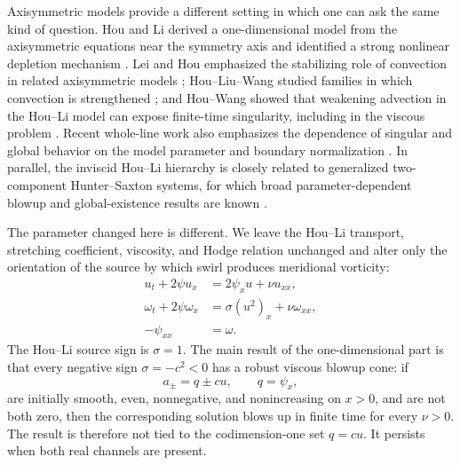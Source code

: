 \documentclass[11pt]{article}
\theoremstyle{definition}
\begin{document}
Axisymmetric models provide a different setting in which one can ask the same kind of question.  Hou and Li derived a one-dimensional model from the axisymmetric equations near the symmetry axis and identified a strong nonlinear depletion mechanism \cite{HouLi2008}.  Lei and Hou emphasized the stabilizing role of convection in related axisymmetric models \cite{LeiHou2009}; Hou--Liu--Wang studied families in which convection is strengthened \cite{HouLiuWang2018}; and Hou--Wang showed that weakening advection in the Hou--Li model can expose finite-time singularity, including in the viscous problem \cite{HouWang2024}.  Recent whole-line work also emphasizes the dependence of singular and global behavior on the model parameter and boundary normalization \cite{WangLi2026}.  In parallel, the inviscid Hou--Li hierarchy is closely related to generalized two-component Hunter--Saxton systems, for which broad parameter-dependent blowup and global-existence results are known \cite{Wunsch2010,WuWunsch2012,MoonLiu2012,Sarria2015}.

The parameter changed here is different.  We leave the Hou--Li transport, stretching coefficient, viscosity, and Hodge relation unchanged and alter only the orientation of the source by which swirl produces meridional vorticity:
\begin{equation}\label{eq:intro-model}
\begin{aligned}
 u_t+2\psi u_x&=2\psi_xu+\nu u_{xx},\\
 \omega_t+2\psi\omega_x&=\sigma (u^2)_x+\nu\omega_{xx},\\
 -\psi_{xx}&=\omega.
\end{aligned}
\end{equation}
The Hou--Li source sign is $\sigma=1$.  The main result of the one-dimensional part is that every negative sign $\sigma=-c^2<0$ has a robust viscous blowup cone: if
\[
 a_\pm=q\pm cu,\qquad q=\psi_x,
\]
are initially smooth, even, nonnegative, and nonincreasing on $x>0$, and are not both zero, then the corresponding solution blows up in finite time for every $\nu>0$.  The result is therefore not tied to the codimension-one set $q=cu$.  It persists when both real channels are present.
\end{document}
